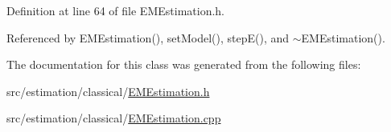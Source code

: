 Definition at line 64 of file E\+M\+Estimation.\+h.



Referenced by E\+M\+Estimation(), set\+Model(), step\+E(), and $\sim$\+E\+M\+Estimation().



The documentation for this class was generated from the following files\+:\begin{DoxyCompactItemize}
\item 
src/estimation/classical/\hyperlink{EMEstimation_8h}{E\+M\+Estimation.\+h}\item 
src/estimation/classical/\hyperlink{EMEstimation_8cpp}{E\+M\+Estimation.\+cpp}\end{DoxyCompactItemize}
